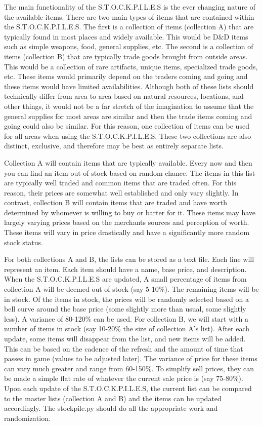 The main functionality of the S.T.O.C.K.P.I.L.E.S is the ever changing nature of the available items. There are two main types of items that are contained within the S.T.O.C.K.P.I.L.E.S. The first is a collection of items (collection A) that are typically found in most places and widely available. This would be D\&D items such as simple weapons, food, general supplies, etc. The second is a collection of items (collection B) that are typically trade goods brought from outside areas. This would be a collection of rare artifacts, unique items, specialized trade goods, etc. These items would primarily depend on the traders coming and going and these items would have limited availabilities. Although both of these lists should technically differ from area to area based on natural resources, locations, and other things, it would not be a far stretch of the imagination to assume that the general supplies for most areas are similar and then the trade items coming and going could also be similar. For this reason, one collection of items can be used for all areas when using the S.T.O.C.K.P.I.L.E.S. These two collections are also distinct, exclusive, and therefore may be best as entirely separate lists.

Collection A will contain items that are typically available. Every now and then you can find an item out of stock based on random chance. The items in this list are typically well traded and common items that are traded often. For this reason, their prices are somewhat well established and only vary slightly. In contrast, collection B will contain items that are traded and have worth determined by whomever is willing to buy or barter for it. These items may have largely varying prices based on the merchants sources and perception of worth. These items will vary in price drastically and have a significantly more random stock status.

For both collections A and B, the lists can be stored as a text file. Each line will represent an item. Each item should have a name, base price, and description. When the S.T.O.C.K.P.I.L.E.S are updated, A small percentage of items from collection A will be deemed out of stock (say 5-10\%). The remaining items will be in stock. Of the items in stock, the prices will be randomly selected based on a bell curve around the base price (some slightly more than usual, some slightly less). A variance of 80-120\% can be used. For collection B, we will start with a number of items in stock (say 10-20\% the size of collection A's list). After each update, some items will disappear from the list, and new items will be added. This can be based on the cadence of the refresh and the amount of time that passes in game (values to be adjusted later). The variance of price for these items can vary much greater and range from 60-150\%. To simplify sell prices, they can be made a simple flat rate of whatever the current sale price is (say 75-80\%). Upon each update of the S.T.O.C.K.P.I.L.E.S, the current list can be compared to the master lists (collection A and B) and the items can be updated accordingly. The stockpile.py should do all the appropriate work and randomization.


